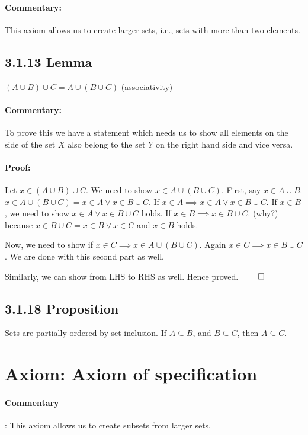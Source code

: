 \documentclass{report}
\begin{document}
\paragraph{Commentary: } This axiom allows us to create larger sets, i.e., sets with more than two elements. 

\subsection*{3.1.13 Lemma} $\left( A \cup B \right) \cup C = A \cup \left( B \cup C \right) $ (associativity)

\paragraph{Commentary: } To prove this we have a statement which needs us to show all elements on the side of the set $X$ also belong to the set $Y$ on the right hand side and vice versa.

\paragraph{Proof: } Let $x \in \left( A \cup B \right) \cup C$. We need to show $x \in A \cup \left( B \cup C \right) $. First, say $x \in A \cup B$. $x \in A \cup \left( B \cup C \right) = x \in A \lor x \in B \cup C$. If $x \in A \implies x \in A \lor x \in B \cup C$. If $x \in B$, we need to show  $x \in A \lor x \in B \cup C $ holds. If  $x \in B \implies x \in B \cup C$. (why?) because  $x \in B \cup C = x \in B \lor x \in C$ and  $x \in B$ holds.

Now, we need to show if $x \in C \implies x \in A \cup \left( B \cup C \right) $. Again $x \in C \implies x \in B \cup C$. We are done with this second part as well. 

Similarly, we can show from LHS to RHS as well. Hence proved.  $\qed$

\subsection*{3.1.18 Proposition} Sets are partially ordered by set inclusion. If  $A \subseteq B$, and  $B \subseteq C$, then  $A \subseteq C$. 

\section{Axiom: Axiom of specification}
\paragraph{Commentary}: This axiom allows us to create subsets from larger sets.
\end{document}
